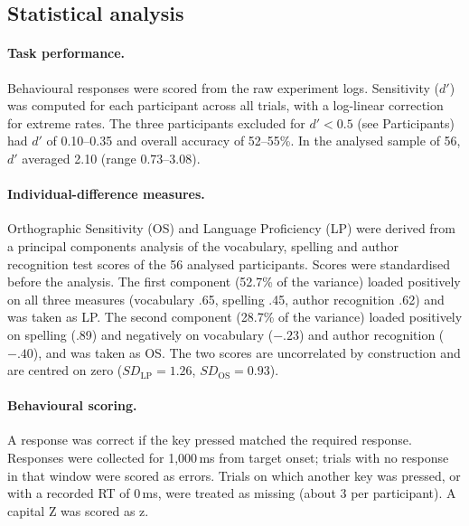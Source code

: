 
\subsection{Statistical analysis}

\paragraph{Task performance.}
Behavioural responses were scored from the raw experiment logs. Sensitivity
($d'$) was computed for each participant across all trials, with a log-linear
correction for extreme rates. The three participants excluded for $d' < 0.5$
(see Participants) had $d'$ of 0.10--0.35 and overall accuracy of 52--55\%. In
the analysed sample of 56, $d'$ averaged 2.10 (range 0.73--3.08).

\paragraph{Individual-difference measures.}
Orthographic Sensitivity (OS) and Language Proficiency (LP) were derived from a
principal components analysis of the vocabulary, spelling and author recognition
test scores of the 56 analysed participants. Scores were standardised before the
analysis. The first component (52.7\% of the variance) loaded positively on all
three measures (vocabulary .65, spelling .45, author recognition .62) and was
taken as LP. The second component (28.7\% of the variance) loaded positively on
spelling (.89) and negatively on vocabulary ($-.23$) and author recognition
($-.40$), and was taken as OS. The two scores are uncorrelated by construction
and are centred on zero ($SD_{\text{LP}} = 1.26$, $SD_{\text{OS}} = 0.93$).

\paragraph{Behavioural scoring.}
A response was correct if the key pressed matched the required response.
Responses were collected for 1,000\,ms from target onset; trials with no
response in that window were scored as errors.
Trials on which another key was pressed, or with a recorded RT of 0\,ms, were
treated as missing (about 3 per participant). A capital Z was scored as z.

